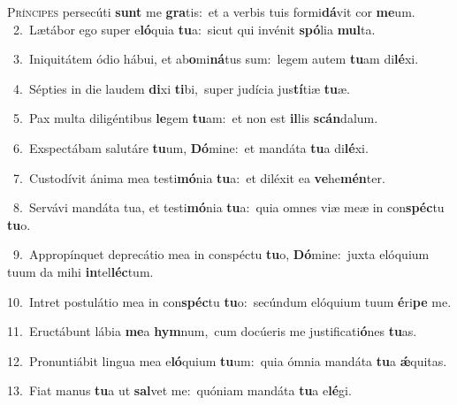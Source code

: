\lettrine{\initial\textcolor{\initialcolor}{P}}{ríncipes} persecúti \textbf{sunt} me \textbf{gra}\-tis:~\star et a verbis tuis formi\-\textbf{dá}\-vit cor \textbf{me}\-um.\\
{\numbfont\textcolor{\numbcolor}{~2.}}~Lætábor ego super e\-\textbf{ló}\-quia \textbf{tu}\-a:~\star sicut qui invénit \textbf{spó}\-lia \textbf{mul}\-ta.\par
{\numbfont\textcolor{\numbcolor}{~3.}}~Iniquitátem ódio hábui, et ab\-\textbf{o}\-mi\-\textbf{ná}\-tus sum:~\star legem autem \textbf{tu}\-am di\-\textbf{lé}\-xi.\par
{\numbfont\textcolor{\numbcolor}{~4.}}~Sépties in die laudem \textbf{di}\-xi \textbf{ti}\-bi,~\star super judícia jus\-\textbf{tí}\-tiæ \textbf{tu}\-æ.\par
{\numbfont\textcolor{\numbcolor}{~5.}}~Pax multa diligéntibus \textbf{le}\-gem \textbf{tu}\-am:~\star et non est \textbf{il}\-lis \textbf{scán}\-dalum.\par
{\numbfont\textcolor{\numbcolor}{~6.}}~Exspectábam salutáre \textbf{tu}\-um, \textbf{Dó}\-mine:~\star et mandáta \textbf{tu}\-a di\-\textbf{lé}\-xi.\par
{\numbfont\textcolor{\numbcolor}{~7.}}~Custodívit ánima mea testi\-\textbf{mó}\-nia \textbf{tu}\-a:~\star et diléxit ea \textbf{ve}\-he\-\textbf{mén}\-ter.\par
{\numbfont\textcolor{\numbcolor}{~8.}}~Servávi mandáta tua, et testi\-\textbf{mó}\-nia \textbf{tu}\-a:~\star quia omnes viæ meæ in con\-\textbf{spéc}\-tu \textbf{tu}\-o.\par
{\numbfont\textcolor{\numbcolor}{~9.}}~Appropínquet deprecátio mea in conspéctu \textbf{tu}\-o, \textbf{Dó}\-mine:~\star juxta elóquium tuum da mihi \textbf{in}\-tel\-\textbf{léc}\-tum.\par
{\numbfont\textcolor{\numbcolor}{10.}}~Intret postulátio mea in con\-\textbf{spéc}\-tu \textbf{tu}\-o:~\star secúndum elóquium tuum \textbf{é}\-ri\textbf{pe} me.\par
{\numbfont\textcolor{\numbcolor}{11.}}~Eructábunt lábia \textbf{me}\-a \textbf{hym}\-num,~\star cum docúeris me justificati\-\textbf{ó}\-nes \textbf{tu}\-as.\par
{\numbfont\textcolor{\numbcolor}{12.}}~Pronuntiábit lingua mea e\-\textbf{ló}\-quium \textbf{tu}\-um:~\star quia ómnia mandáta \textbf{tu}\-a \textbf{ǽ}\-quitas.\par
{\numbfont\textcolor{\numbcolor}{13.}}~Fiat manus \textbf{tu}\-a ut \textbf{sal}\-vet me:~\star quóniam mandáta \textbf{tu}\-a e\-\textbf{lé}\-gi.\par

